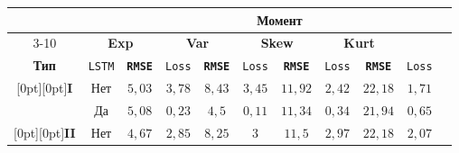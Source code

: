 \begin{table}

{\small %

\begin{center}

\parbox{390pt}{

}




\vspace*{2ex}



\tabcolsep=10pt

\begin{tabular}{|c|c|c|c|c|c|c|c|c|c|c|}

\hline


\multicolumn{2}{|c|}{\ }&\multicolumn{8}{c|}{\bf Момент}\\

\cline{3-10}

\multicolumn{2}{|c|}{\raisebox{6pt}[0pt][0pt]{\bf Архитектура}}&\multicolumn{2}{c|}{\bf Exp}&

\multicolumn{2}{c|}{\bf Var}&\multicolumn{2}{c|}{\bf Skew}&

\multicolumn{2}{c|}{\bf Kurt}\\

\hline

{\bf Тип}&\verb"LSTM"&{\bf \verb"RMSE"}&\verb"Loss"&{\bf \verb"RMSE"}&\verb"Loss"&{\bf \verb"RMSE"}&\verb"Loss"&{\bf \verb"RMSE"}&\verb"Loss"\\

\hline

\multicolumn{1}{|c|}{\raisebox{-6pt}[0pt][0pt]{{\bf I}}}&Нет&$5{,}03$&$3{,}78$&$8{,}43$&$3{,}45$&$11{,}92$&$2{,}42$&$22{,}18$&$1{,}71$\\


&Да&$5{,}08$&$0{,}23$&$4{,}5$\hphantom{9}&$0{,}11$&$11{,}34$&$0{,}34$&$21{,}94$&$0{,}65$\\

\hline

\multicolumn{1}{|c|}{\raisebox{-6pt}[0pt][0pt]{{\bf II}}}&Нет&

$4{,}67$&$2{,}85$&$8{,}25$&$3$\hphantom{,99}&$11{,}5$\hphantom{9}&$2{,}97$&$22{,}18$&$2{,}07$\\


\end{tabular}
\end{center}}
\end{table}
